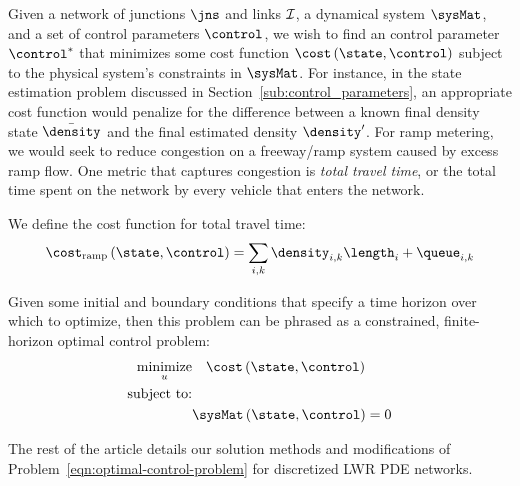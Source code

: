 



Given a network of junctions $\jns$ and links $\mathcal{I}$, a dynamical system $\sysMat$, and a set of control parameters $\control$, we wish to find an control parameter $\control^*$ that minimizes some cost function $\cost\left(\state,\control\right)$ subject to the physical system's constraints in $\sysMat$. For instance, in the state estimation problem discussed in Section~\ref{sub:control_parameters}, an appropriate cost function would penalize for the difference between a known final density state $\bar{\density}$ and the final estimated density $\density'$.
For ramp metering, we would seek to reduce congestion on a freeway/ramp system caused by excess ramp flow. One metric that captures congestion is \emph{total travel time}, or the total time spent on the network by every vehicle that enters the network.

We define the cost function for total travel time:
\begin{equation}
    \label{eqn:total-travel-time}
    \cost_{\text{ramp}}\left(\state,\control\right) = \sum_{i,k} \idx{\density}{i}{k}\length_i + \idx{\queue}{i}{k}
\end{equation}

Given some initial and boundary conditions that specify a time horizon over which to optimize, then this problem can be phrased as a constrained, finite-horizon optimal control problem:
\begin{equation}
\begin{aligned}
\label{eqn:optimal-control-problem}
\underset{u}{\text{minimize}} & \quad \cost\left(\state,\control\right) \\
\text{subject to:} & \\
& \sysMat \left(\state, \control\right) = 0
\end{aligned}
\end{equation}

The rest of the article details our solution methods and modifications of Problem~\eqref{eqn:optimal-control-problem} for discretized LWR PDE networks.